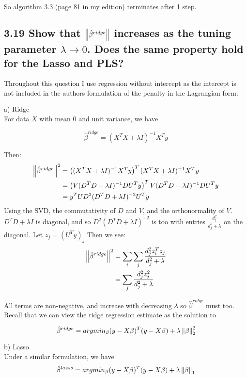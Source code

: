 So algorithm 3.3 (page 81 in my edition) terminates after 1 step.






\subsection*{3.19 Show that $\left\lVert\hat{\beta}^{ridge}\right\rVert$ increases as the tuning parameter $\lambda \rightarrow 0$. Does the same property hold for the Lasso and PLS?}

Throughout this question I use regression without intercept as the intercept is not included in the authors formulation of the penalty in the Lagrangian form.

a) Ridge\\
For data $X$ with mean 0 and unit variance, we have

$$\hat{\beta}^{ridge} = (X^TX + \lambda I)^{-1}X^T y$$

Then:
\begin{align*}
     \left\lVert\hat{\beta}^{ridge}\right\rVert^2 &= \left((X^TX + \lambda I)^{-1}X^T y\right)^T (X^TX + \lambda I)^{-1}X^T y \\
     &= \left(V (D^TD + \lambda I)^{-1}D U^T y\right)^T V(D^T D + \lambda I)^{-1} D U^T y \\
     &= y^T U D^2 (D^T D + \lambda I)^{-2} U^T y
\end{align*}
Using the SVD, the commutativity of $D$ and $V$, and the orthonormality of $V$.
$D^T D + \lambda I$ is diagonal, and so $D^2 (D^T D + \lambda I)^{-2}$ is too with entries $\frac{d_j^2}{d_j^2 + \lambda}$ on the diagonal.
Let $z_j = (U^T y)_j$
Then we see:
\begin{align*}
\left\lVert\hat{\beta}^{ridge}\right\rVert^2 &= \sum_i \sum_j \frac{d_j^2 z_i^T z_j}{d_j^2 + \lambda}\\
&= \sum_j \frac{d_j^2 z_j^2}{d_j^2 + \lambda}\\
\end{align*} 

All terms are non-negative, and increase with decreasing $\lambda$ so $\hat{\beta}^{ridge}$ must too.
Recall that we can view the ridge regression estimate as the solution to

$$\hat{\beta}^{ridge} = argmin_\beta (y - X\beta)^T (y - X \beta) + \lambda \left\lVert\beta\right\rVert_2^2$$

b) Lasso\\

Under a similar formulation, we have 
$$\hat{\beta}^{lasso} = argmin_\beta (y - X\beta)^T (y - X \beta) + \lambda \left\lVert\beta\right\rVert_1$$

